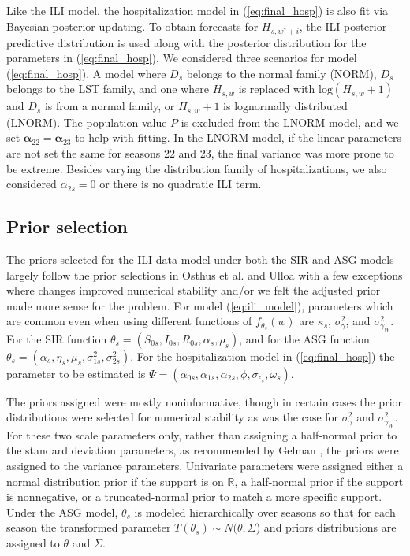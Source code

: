 Like the ILI model, the hospitalization model in (\ref{eq:final_hosp}) is also 
fit via Bayesian posterior updating. To obtain forecasts for $H_{s, w^* + i}$, 
the ILI posterior predictive distribution is used along with the posterior 
distribution for the parameters in (\ref{eq:final_hosp}). We considered three 
scenarios for model (\ref{eq:final_hosp}). A model where $D_s$ belongs to the 
normal family (NORM), $D_s$ belongs to the LST family, and one where $H_{s,w}$ 
is replaced with $\text{log}(H_{s,w} + 1)$ and $D_s$ is from a normal family, 
or $H_{s,w} + 1$ is lognormally distributed (LNORM). The population value $P$ 
is excluded from the LNORM model, and we set 
$\boldsymbol{\alpha}_{22} = \boldsymbol{\alpha}_{23}$ to help with fitting. In 
the LNORM model, if the linear parameters are not set the same for seasons 22 
and 23, the final variance was more prone to be extreme. Besides varying the 
distribution family of hospitalizations, we also considered $\alpha_{2s} = 0$ 
or there is no quadratic ILI term.


\subsection{Prior selection}


The priors selected for the ILI data model under both the SIR and ASG models 
largely follow the prior selections in Osthus et al. \cite[]{osthus2019dynamic} 
and Ulloa \cite[]{ulloa2019} with a few exceptions where changes improved 
numerical stability and/or we felt the adjusted prior made more sense for the 
problem. For model (\ref{eq:ili_model}), parameters which are common even when 
using different functions of $f_{\theta_s}(w)$ are $\kappa_s$, 
$\sigma_{\gamma}^2$, and $\sigma_{\gamma_W}^2$. For the SIR function 
$\theta_s = (S_{0s}, I_{0s}, R_{0s}, \alpha_s, \rho_s)$, and for the ASG 
function $\theta_s = (\alpha_s, \eta_s, \mu_s, \sigma_{1s}^2, \sigma_{2s}^2)$. 
For the hospitalization model in (\ref{eq:final_hosp}) the parameter to be 
estimated is $\Psi = (\alpha_{0s}, \alpha_{1s}, \alpha_{2s}, \phi, \sigma_{\epsilon_s}, \omega_s)$. 


The priors assigned were mostly noninformative, though in certain cases the 
prior distributions were selected for numerical stability as was the case 
for $\sigma_{\gamma}^2$ and $\sigma_{\gamma_W}^2$. For these two scale 
parameters only, rather than assigning a half-normal prior to the standard 
deviation parameters, as recommended by Gelman \cite[]{gelman2006prior}, the 
priors were assigned to the variance parameters. Univariate parameters were 
assigned either a normal distribution prior if the support is on $\mathbb{R}$, 
a half-normal prior if the support is nonnegative, or a truncated-normal 
prior to match a more specific support. Under the ASG model, $\theta_s$ is 
modeled hierarchically over seasons so that for each season the transformed 
parameter $T(\theta_s) \sim N(\theta, \Sigma$) and priors distributions are 
assigned to $\theta$ and $\Sigma$.



